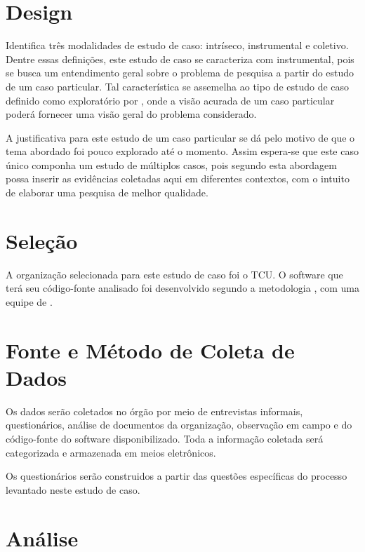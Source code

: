 \section{Design}\label{sec:Design}

 Identifica três modalidades de estudo de caso: intríseco, instrumental e coletivo. Dentre essas definições, este estudo de caso se caracteriza com instrumental, pois se busca um entendimento geral sobre o problema de pesquisa a partir do estudo de um caso particular. Tal característica se assemelha ao tipo de estudo de caso definido como exploratório por , onde a visão acurada de um caso particular poderá fornecer uma visão geral do problema considerado.

A justificativa para este estudo de um caso particular se dá pelo motivo de que o tema abordado foi pouco explorado até o momento. Assim espera-se que este caso único componha um estudo de múltiplos casos, pois segundo  esta abordagem possa inserir as evidências coletadas aqui em diferentes contextos, com o intuito de elaborar uma pesquisa de melhor qualidade.



\section{Seleção}\label{sec:Seleção}

A organização selecionada para este estudo de caso foi o 
TCU.
O software que terá seu código-fonte analisado foi desenvolvido segundo a metodologia
, com uma equipe de 
.

\section{Fonte e Método de Coleta de Dados}\label{sec:Fonte e Método de Coleta de Dados}

Os dados serão coletados no órgão por meio de entrevistas informais, questionários, análise de documentos da organização, observação em campo e do código-fonte do software disponibilizado.
Toda a informação coletada será categorizada e armazenada em meios eletrônicos.

Os questionários serão construidos a partir das questões específicas do processo levantado neste estudo de caso.


\section{Análise}\label{sec:Análise}

